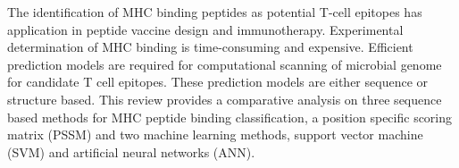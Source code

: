 
The identification of MHC binding peptides as potential T-cell epitopes has application in peptide vaccine design and immunotherapy. 
Experimental determination of MHC binding is time-consuming and expensive.
Efficient prediction models are required for computational scanning of microbial genome for candidate T cell epitopes. 
These prediction models are either sequence or structure based. 
This review provides a comparative analysis on three sequence based methods for MHC peptide binding classification, 
a position specific scoring matrix (PSSM) and two machine learning methods, support vector machine (SVM) and artificial neural networks (ANN).
